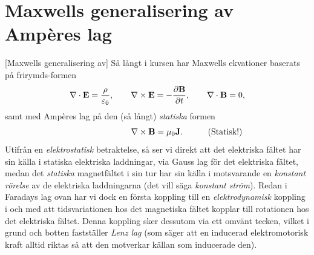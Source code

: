 \section{Maxwells generalisering av Amp{\`e}res lag}
[Maxwells generalisering av]
S{\aa} l{\aa}ngt i kursen
har Maxwells ekvationer baserats p{\aa} frirymds-formen
$$
  \nabla\cdot{\bf E}={{\rho}\over{\varepsilon_0}},\qquad
  \nabla\times{\bf E}=-{{\partial{\bf B}}\over{\partial t}},\qquad
  \nabla\cdot{\bf B}=0,
$$
samt med Amp{\`e}res lag p{\aa} den (s{\aa} l{\aa}ngt) {\it statiska} formen
$$
  \hskip70pt\nabla\times{\bf B}=\mu_0{\bf J}.\hskip30pt(\hbox{Statisk!})
$$
Utifr{\aa}n en {\it elektrostatisk} betraktelse, s{\aa} ser vi direkt att det
elektriska f{\"a}ltet har sin k{\"a}lla i statiska elektriska laddningar, via
Gauss lag f{\"o}r det elektriska f{\"a}ltet, medan det {\it statiska}
magnetf{\"a}ltet i sin tur har sin k{\"a}lla i motsvarande en  {\it konstant
r{\"o}relse} av de elektriska laddningarna (det vill s{\"a}ga {\it konstant
str{\"o}m}).
Redan i Faradays lag ovan har vi dock en f{\"o}rsta koppling till en
{\it elektrodynamisk} koppling i och med att tidsvariationen hos det magnetiska
f{\"a}ltet kopplar till rotationen hos det elektriska f{\"a}ltet.
Denna koppling sker dessutom via ett omv{\"a}nt tecken, vilket i grund och
botten fastst{\"a}ller {\it Lenz lag} (som s{\"a}ger att en inducerad
elektromotorisk kraft alltid riktas s{\aa} att den motverkar k{\"a}llan som
inducerade den).

